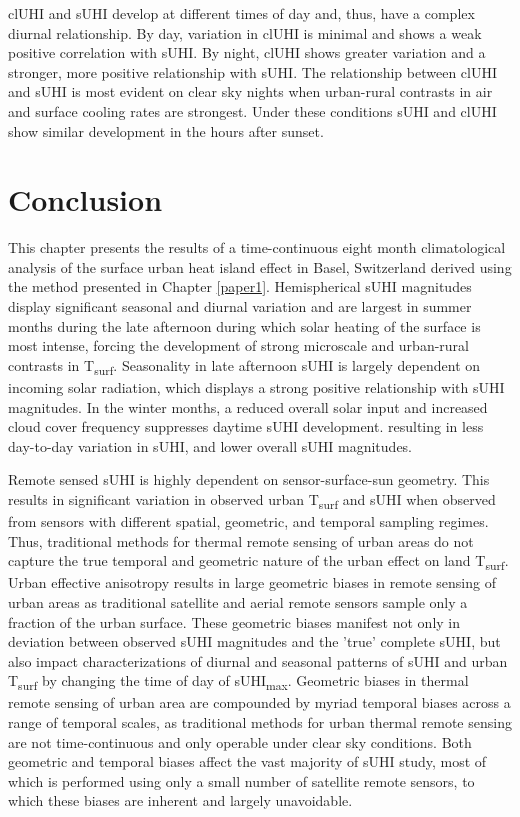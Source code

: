 clUHI and sUHI develop at different times of day and, thus, have a complex diurnal relationship. By day, variation in clUHI is minimal and shows a weak positive correlation with sUHI. By night, clUHI shows greater variation and a stronger, more positive relationship with sUHI. The relationship between clUHI and sUHI is most evident on clear sky nights when urban-rural contrasts in air and surface cooling rates are strongest. Under these conditions sUHI and clUHI  show similar development in the hours after sunset.

\section{Conclusion}

This chapter presents the results of a time-continuous eight month climatological analysis of the surface urban heat island effect in Basel, Switzerland derived using the method presented in Chapter \ref{paper1}. Hemispherical sUHI magnitudes display significant seasonal and diurnal variation and are largest in summer months during the late afternoon during which solar heating of the surface is most intense, forcing the development of strong microscale and urban-rural contrasts in T\textsubscript{surf}. Seasonality in late afternoon sUHI is largely dependent on incoming solar radiation, which displays a strong positive relationship with sUHI magnitudes. In the winter months, a reduced overall solar input and increased cloud cover frequency suppresses daytime sUHI development. resulting in less day-to-day variation in sUHI, and lower overall sUHI magnitudes. 

Remote sensed sUHI is highly dependent on sensor-surface-sun geometry. This results in significant variation in observed urban T\textsubscript{surf} and sUHI when observed from sensors with different spatial, geometric, and temporal sampling regimes. Thus, traditional methods for thermal remote sensing of urban areas do not capture the true temporal and geometric nature of the urban effect on land T\textsubscript{surf}. Urban effective anisotropy results in large geometric biases in remote sensing of urban areas as traditional satellite and aerial remote sensors sample only a fraction of the urban surface. These geometric biases manifest not only in deviation between observed sUHI magnitudes and the 'true' complete sUHI, but also impact characterizations of diurnal and seasonal patterns of sUHI and urban T\textsubscript{surf} by changing the time of day of sUHI\textsubscript{max}. Geometric biases in thermal remote sensing of urban area are compounded by myriad temporal biases across a range of temporal scales, as traditional methods for urban thermal remote sensing are not time-continuous and only operable under clear sky conditions. Both geometric and temporal biases affect the vast majority of sUHI study, most of which is performed using only a small number of satellite remote sensors, to which these biases are inherent and largely unavoidable. 

